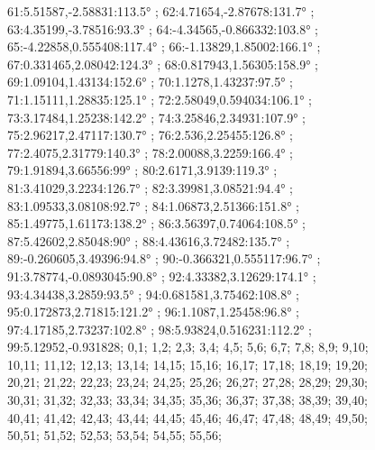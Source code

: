 \documentclass[a4paper,10pt,ngerman]{scrartcl}
\begin{document}
\begin{figure}[!h]
{            61:5.51587,-2.58831:113.5° ;
            62:4.71654,-2.87678:131.7° ;
            63:4.35199,-3.78516:93.3° ;
            64:-4.34565,-0.866332:103.8° ;
            65:-4.22858,0.555408:117.4° ;
            66:-1.13829,1.85002:166.1° ;
            67:0.331465,2.08042:124.3° ;
            68:0.817943,1.56305:158.9° ;
            69:1.09104,1.43134:152.6° ;
            70:1.1278,1.43237:97.5° ;
            71:1.15111,1.28835:125.1° ;
            72:2.58049,0.594034:106.1° ;
            73:3.17484,1.25238:142.2° ;
            74:3.25846,2.34931:107.9° ;
            75:2.96217,2.47117:130.7° ;
            76:2.536,2.25455:126.8° ;
            77:2.4075,2.31779:140.3° ;
            78:2.00088,3.2259:166.4° ;
            79:1.91894,3.66556:99° ;
            80:2.6171,3.9139:119.3° ;
            81:3.41029,3.2234:126.7° ;
            82:3.39981,3.08521:94.4° ;
            83:1.09533,3.08108:92.7° ;
            84:1.06873,2.51366:151.8° ;
            85:1.49775,1.61173:138.2° ;
            86:3.56397,0.74064:108.5° ;
            87:5.42602,2.85048:90° ;
            88:4.43616,3.72482:135.7° ;
            89:-0.260605,3.49396:94.8° ;
            90:-0.366321,0.555117:96.7° ;
            91:3.78774,-0.0893045:90.8° ;
            92:4.33382,3.12629:174.1° ;
            93:4.34438,3.2859:93.5° ;
            94:0.681581,3.75462:108.8° ;
            95:0.172873,2.71815:121.2° ;
            96:1.1087,1.25458:96.8° ;
            97:4.17185,2.73237:102.8° ;
            98:5.93824,0.516231:112.2° ;
            99:5.12952,-0.931828;
        }{
            0,1;
            1,2;
            2,3;
            3,4;
            4,5;
            5,6;
            6,7;
            7,8;
            8,9;
            9,10;
            10,11;
            11,12;
            12,13;
            13,14;
            14,15;
            15,16;
            16,17;
            17,18;
            18,19;
            19,20;
            20,21;
            21,22;
            22,23;
            23,24;
            24,25;
            25,26;
            26,27;
            27,28;
            28,29;
            29,30;
            30,31;
            31,32;
            32,33;
            33,34;
            34,35;
            35,36;
            36,37;
            37,38;
            38,39;
            39,40;
            40,41;
            41,42;
            42,43;
            43,44;
            44,45;
            45,46;
            46,47;
            47,48;
            48,49;
            49,50;
            50,51;
            51,52;
            52,53;
            53,54;
            54,55;
            55,56;
}
\end{figure}
\end{document}
